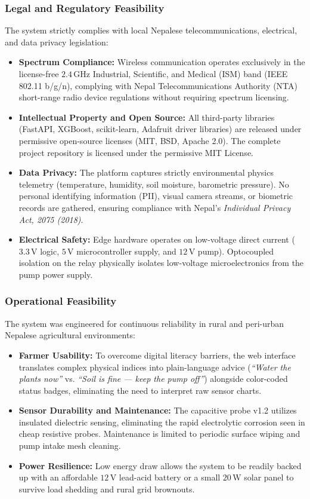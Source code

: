 \documentclass[12pt, a4paper]{article}
\begin{document}
\subsubsection{Legal and Regulatory Feasibility}
The system strictly complies with local Nepalese telecommunications, electrical, and data privacy legislation:
\begin{itemize}[noitemsep]
    \item \textbf{Spectrum Compliance:} Wireless communication operates exclusively in the license-free $2.4\,\text{GHz}$ Industrial, Scientific, and Medical (ISM) band (IEEE 802.11 b/g/n), complying with Nepal Telecommunications Authority (NTA) short-range radio device regulations without requiring spectrum licensing.
    \item \textbf{Intellectual Property and Open Source:} All third-party libraries (FastAPI, XGBoost, scikit-learn, Adafruit driver libraries) are released under permissive open-source licenses (MIT, BSD, Apache 2.0). The complete project repository is licensed under the permissive MIT License.
    \item \textbf{Data Privacy:} The platform captures strictly environmental physics telemetry (temperature, humidity, soil moisture, barometric pressure). No personal identifying information (PII), visual camera streams, or biometric records are gathered, ensuring compliance with Nepal's \emph{Individual Privacy Act, 2075 (2018)}.
    \item \textbf{Electrical Safety:} Edge hardware operates on low-voltage direct current ($3.3\,\text{V}$ logic, $5\,\text{V}$ microcontroller supply, and $12\,\text{V}$ pump). Optocoupled isolation on the relay physically isolates low-voltage microelectronics from the pump power supply.
\end{itemize}

\subsubsection{Operational Feasibility}
The system was engineered for continuous reliability in rural and peri-urban Nepalese agricultural environments:
\begin{itemize}[noitemsep]
    \item \textbf{Farmer Usability:} To overcome digital literacy barriers, the web interface translates complex physical indices into plain-language advice (\emph{``Water the plants now''} vs. \emph{``Soil is fine — keep the pump off''}) alongside color-coded status badges, eliminating the need to interpret raw sensor charts.
    \item \textbf{Sensor Durability and Maintenance:} The capacitive probe v1.2 utilizes insulated dielectric sensing, eliminating the rapid electrolytic corrosion seen in cheap resistive probes. Maintenance is limited to periodic surface wiping and pump intake mesh cleaning.
    \item \textbf{Power Resilience:} Low energy draw allows the system to be readily backed up with an affordable $12\,\text{V}$ lead-acid battery or a small $20\,\text{W}$ solar panel to survive load shedding and rural grid brownouts.
\end{itemize}
\end{document}

